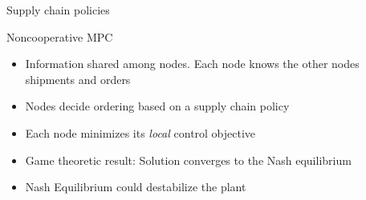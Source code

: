 \documentclass[table]{beamer}
\begin{document}
\begin{frame}{Supply chain policies}
\centerline{\color{blue}{Incomplete information + Model mismatch $\implies$ poor performance}}
\end{frame}

\begin{frame}{Noncooperative MPC}
\begin{figure}
 \centering
  \resizebox{0.7\textwidth}{!}{}
\end{figure}
\begin{itemize}
 \item Information shared among nodes. Each node knows the other
     nodes shipments and orders
   \item Nodes decide ordering based on a supply chain policy
   \item Each node minimizes its \alert{\it{local}} control objective
   \item \alert{Game theoretic result:} Solution converges to the Nash
     equilibrium
   \item Nash Equilibrium could \alert{destabilize} the plant
\end{itemize}
\end{frame}
\end{document}
